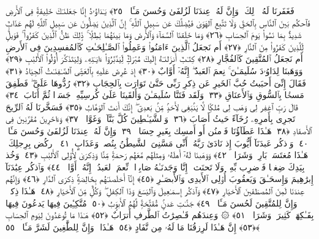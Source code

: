  فَغَفَرنَا لَهُۥ ذَٟلِكَ ۖ وَإِنَّ لَهُۥ عِندَنَا لَزُلفَىٰ وَحُسنَ مَـَٔابٍۢ ﴿٢٥﴾
 يَـٰدَاوُۥدُ إِنَّا جَعَلنَـٰكَ خَلِيفَةًۭ فِى ٱلأَرضِ فَٱحكُم بَينَ ٱلنَّاسِ بِٱلحَقِّ وَلَا تَتَّبِعِ ٱلهَوَىٰ فَيُضِلَّكَ عَن سَبِيلِ ٱللَّهِ ۚ إِنَّ ٱلَّذِينَ يَضِلُّونَ عَن سَبِيلِ ٱللَّهِ لَهُم عَذَابٌۭ شَدِيدٌۢ بِمَا نَسُوا۟ يَومَ ٱلحِسَابِ ﴿٢٦﴾
 وَمَا خَلَقنَا ٱلسَّمَآءَ وَٱلأَرضَ وَمَا بَينَهُمَا بَٰطِلًۭا ۚ ذَٟلِكَ ظَنُّ ٱلَّذِينَ كَفَرُوا۟ ۚ فَوَيلٌۭ لِّلَّذِينَ كَفَرُوا۟ مِنَ ٱلنَّارِ ﴿٢٧﴾
 أَم نَجعَلُ ٱلَّذِينَ ءَامَنُوا۟ وَعَمِلُوا۟ ٱلصَّـٰلِحَـٰتِ كَٱلمُفسِدِينَ فِى ٱلأَرضِ أَم نَجعَلُ ٱلمُتَّقِينَ كَٱلفُجَّارِ ﴿٢٨﴾
 كِتَـٰبٌ أَنزَلنَـٰهُ إِلَيكَ مُبَٰرَكٌۭ لِّيَدَّبَّرُوٓا۟ ءَايَـٰتِهِۦ وَلِيَتَذَكَّرَ أُو۟لُوا۟ ٱلأَلبَٰبِ ﴿٢٩﴾
 وَوَهَبنَا لِدَاوُۥدَ سُلَيمَـٰنَ ۚ نِعمَ ٱلعَبدُ ۖ إِنَّهُۥٓ أَوَّابٌ ﴿٣٠﴾
 إِذ عُرِضَ عَلَيهِ بِٱلعَشِىِّ ٱلصَّـٰفِنَـٰتُ ٱلجِيَادُ ﴿٣١﴾
 فَقَالَ إِنِّىٓ أَحبَبتُ حُبَّ ٱلخَيرِ عَن ذِكرِ رَبِّى حَتَّىٰ تَوَارَت بِٱلحِجَابِ ﴿٣٢﴾
 رُدُّوهَا عَلَىَّ ۖ فَطَفِقَ مَسحًۢا بِٱلسُّوقِ وَٱلأَعنَاقِ ﴿٣٣﴾
 وَلَقَد فَتَنَّا سُلَيمَـٰنَ وَأَلقَينَا عَلَىٰ كُرسِيِّهِۦ جَسَدًۭا ثُمَّ أَنَابَ ﴿٣٤﴾
 قَالَ رَبِّ ٱغفِر لِى وَهَب لِى مُلكًۭا لَّا يَنۢبَغِى لِأَحَدٍۢ مِّنۢ بَعدِىٓ ۖ إِنَّكَ أَنتَ ٱلوَهَّابُ ﴿٣٥﴾
 فَسَخَّرنَا لَهُ ٱلرِّيحَ تَجرِى بِأَمرِهِۦ رُخَآءً حَيثُ أَصَابَ ﴿٣٦﴾
 وَٱلشَّيَـٰطِينَ كُلَّ بَنَّآءٍۢ وَغَوَّاصٍۢ ﴿٣٧﴾
 وَءَاخَرِينَ مُقَرَّنِينَ فِى ٱلأَصفَادِ ﴿٣٨﴾
 هَـٰذَا عَطَآؤُنَا فَٱمنُن أَو أَمسِك بِغَيرِ حِسَابٍۢ ﴿٣٩﴾
 وَإِنَّ لَهُۥ عِندَنَا لَزُلفَىٰ وَحُسنَ مَـَٔابٍۢ ﴿٤٠﴾
 وَٱذكُر عَبدَنَآ أَيُّوبَ إِذ نَادَىٰ رَبَّهُۥٓ أَنِّى مَسَّنِىَ ٱلشَّيطَٰنُ بِنُصبٍۢ وَعَذَابٍ ﴿٤١﴾
 ٱركُض بِرِجلِكَ ۖ هَـٰذَا مُغتَسَلٌۢ بَارِدٌۭ وَشَرَابٌۭ ﴿٤٢﴾
 وَوَهَبنَا لَهُۥٓ أَهلَهُۥ وَمِثلَهُم مَّعَهُم رَحمَةًۭ مِّنَّا وَذِكرَىٰ لِأُو۟لِى ٱلأَلبَٰبِ ﴿٤٣﴾
 وَخُذ بِيَدِكَ ضِغثًۭا فَٱضرِب بِّهِۦ وَلَا تَحنَث ۗ إِنَّا وَجَدنَـٰهُ صَابِرًۭا ۚ نِّعمَ ٱلعَبدُ ۖ إِنَّهُۥٓ أَوَّابٌۭ ﴿٤٤﴾
 وَٱذكُر عِبَٰدَنَآ إِبرَٰهِيمَ وَإِسحَـٰقَ وَيَعقُوبَ أُو۟لِى ٱلأَيدِى وَٱلأَبصَـٰرِ ﴿٤٥﴾
 إِنَّآ أَخلَصنَـٰهُم بِخَالِصَةٍۢ ذِكرَى ٱلدَّارِ ﴿٤٦﴾
 وَإِنَّهُم عِندَنَا لَمِنَ ٱلمُصطَفَينَ ٱلأَخيَارِ ﴿٤٧﴾
 وَٱذكُر إِسمَـٰعِيلَ وَٱليَسَعَ وَذَا ٱلكِفلِ ۖ وَكُلٌّۭ مِّنَ ٱلأَخيَارِ ﴿٤٨﴾
 هَـٰذَا ذِكرٌۭ ۚ وَإِنَّ لِلمُتَّقِينَ لَحُسنَ مَـَٔابٍۢ ﴿٤٩﴾
 جَنَّـٰتِ عَدنٍۢ مُّفَتَّحَةًۭ لَّهُمُ ٱلأَبوَٟبُ ﴿٥٠﴾
 مُتَّكِـِٔينَ فِيهَا يَدعُونَ فِيهَا بِفَـٰكِهَةٍۢ كَثِيرَةٍۢ وَشَرَابٍۢ ﴿٥١﴾
 ۞ وَعِندَهُم قَـٰصِرَٰتُ ٱلطَّرفِ أَترَابٌ ﴿٥٢﴾
 هَـٰذَا مَا تُوعَدُونَ لِيَومِ ٱلحِسَابِ ﴿٥٣﴾
 إِنَّ هَـٰذَا لَرِزقُنَا مَا لَهُۥ مِن نَّفَادٍ ﴿٥٤﴾
 هَـٰذَا ۚ وَإِنَّ لِلطَّٰغِينَ لَشَرَّ مَـَٔابٍۢ ﴿٥٥﴾
